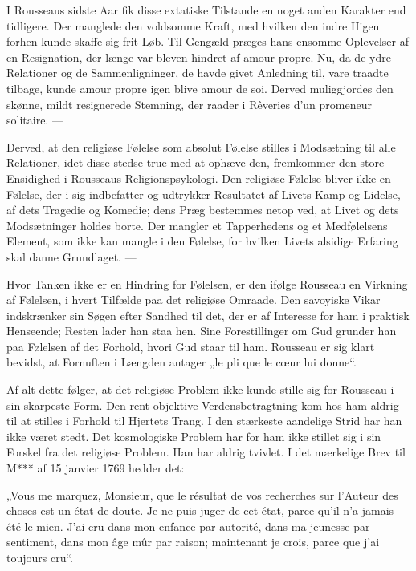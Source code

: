 \documentclass[12pt,a4paper,openany]{book}
\newcommand{\opage}[1]{\marginnote{\footnotesize\textit{[#1]}}}
\begin{document}
I Rousseaus sidste Aar fik disse extatiske Tilstande en
noget anden Karakter end tidligere. Der manglede den voldsomme
Kraft, med hvilken den indre Higen forhen kunde skaffe
sig frit Løb. Til Gengæld præges hans ensomme Oplevelser af
en Resignation, der længe var bleven hindret af amour-propre.
Nu, da de ydre Relationer og de Sammenligninger, de havde
givet Anledning til, vare traadte tilbage, kunde amour propre
igen blive amour de soi. Derved muliggjordes den skønne,
mildt resignerede Stemning, der raader i Rêveries d’un promeneur
solitaire. ---

Derved, at den religiøse Følelse som absolut Følelse stilles
i Modsætning til alle Relationer, idet disse stedse true med at
ophæve den, fremkommer den store Ensidighed i Rousseaus Religionspsykologi.
Den religiøse Følelse bliver ikke en Følelse,
der i sig indbefatter og udtrykker Resultatet af Livets Kamp og
Lidelse, af dets Tragedie og Komedie; dens Præg bestemmes
netop ved, at Livet og dets Modsætninger holdes borte. Der
mangler et Tapperhedens og et Medfølelsens Element, som ikke
kan mangle i den Følelse, for hvilken Livets alsidige Erfaring
skal danne Grundlaget. ---

Hvor Tanken ikke er en Hindring for Følelsen, er den
ifølge Rousseau en Virkning af Følelsen, i hvert Tilfælde paa
det religiøse Omraade. Den savoyiske Vikar indskrænker sin
Søgen efter Sandhed til det, der er af Interesse for ham i praktisk
Henseende; Resten lader han staa hen. Sine Forestillinger
om Gud grunder han paa Følelsen af det Forhold, hvori Gud
staar til ham. Rousseau er sig klart bevidst, at Fornuften i
Længden antager „le pli que le cœur lui donne“.

Af alt dette følger, at det religiøse Problem ikke kunde
stille sig for Rousseau i sin skarpeste Form. Den rent objektive
Verdensbetragtning kom hos ham aldrig til at stilles i Forhold
til Hjertets Trang. I den stærkeste aandelige Strid har
han ikke været stedt. Det kosmologiske Problem har for ham
ikke stillet sig i sin Forskel fra det religiøse Problem. Han
\setcounter{footnote}{0}%
\opage{150}har aldrig tvivlet. I det mærkelige Brev til M*** af 15 janvier
1769 hedder det:

„Vous me marquez, Monsieur, que le résultat de vos recherches
sur l’Auteur des choses est un état de doute. Je ne
puis juger de cet état, parce qu’il n’a jamais été le mien. J’ai
cru dans mon enfance par autorité, dans ma jeunesse par sentiment,
dans mon âge mûr par raison; maintenant je crois, parce
que j’ai toujours cru“.
\end{document}
